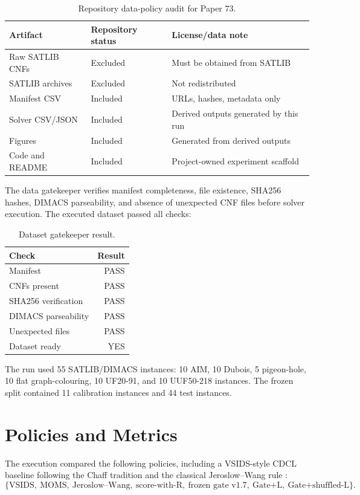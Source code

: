 \documentclass[11pt,a4paper]{article}
\begin{document}
\begin{table}[h]
\centering
\caption{Repository data-policy audit for Paper 73.}
\begin{tabular}{lll}
\toprule
Artifact & Repository status & License/data note \\
\midrule
Raw SATLIB CNFs & Excluded & Must be obtained from SATLIB \\
SATLIB archives & Excluded & Not redistributed \\
Manifest CSV & Included & URLs, hashes, metadata only \\
Solver CSV/JSON & Included & Derived outputs generated by this run \\
Figures & Included & Generated from derived outputs \\
Code and README & Included & Project-owned experiment scaffold \\
\bottomrule
\end{tabular}
\end{table}

The data gatekeeper verifies manifest completeness, file existence, SHA256
hashes, DIMACS parseability, and absence of unexpected CNF files before solver
execution. The executed dataset passed all checks:
\begin{table}[h]
\centering
\caption{Dataset gatekeeper result.}
\begin{tabular}{lr}
\toprule
Check & Result \\
\midrule
Manifest & PASS \\
CNFs present & PASS \\
SHA256 verification & PASS \\
DIMACS parseability & PASS \\
Unexpected files & PASS \\
Dataset ready & YES \\
\bottomrule
\end{tabular}
\end{table}

The run used 55 SATLIB/DIMACS instances: 10 AIM, 10 Dubois, 5 pigeon-hole,
10 flat graph-colouring, 10 UF20-91, and 10 UUF50-218 instances. The frozen
split contained 11 calibration instances and 44 test instances.

\section{Policies and Metrics}

The execution compared the following policies, including a VSIDS-style CDCL
baseline following the Chaff tradition \cite{chaff} and the classical
Jeroslow--Wang rule \cite{jeroslow-wang}:
\[
\{\text{VSIDS},\ \text{MOMS},\ \text{Jeroslow--Wang},\
\text{score-with-R},\ \text{frozen gate v1.7},\ \text{Gate+L},\
\text{Gate+shuffled-L}\}.
\]
\end{document}
